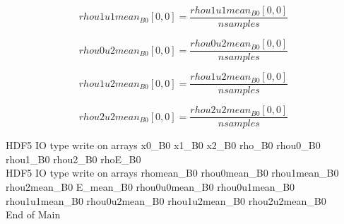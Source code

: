 \documentclass{article}
\begin{document}
\begin{dmath}{rhou1u1mean{_{B0}}}[{0,0}] = \frac{{rhou1u1mean{_{B0}}}[{0,0}]}{nsamples}\end{dmath}

\begin{dmath}{rhou0u2mean{_{B0}}}[{0,0}] = \frac{{rhou0u2mean{_{B0}}}[{0,0}]}{nsamples}\end{dmath}

\begin{dmath}{rhou1u2mean{_{B0}}}[{0,0}] = \frac{{rhou1u2mean{_{B0}}}[{0,0}]}{nsamples}\end{dmath}

\begin{dmath}{rhou2u2mean{_{B0}}}[{0,0}] = \frac{{rhou2u2mean{_{B0}}}[{0,0}]}{nsamples}\end{dmath}

\noindent HDF5 IO type write on arrays x0_B0 x1_B0 x2_B0 rho_B0 rhou0_B0 rhou1_B0 rhou2_B0 rhoE_B0\\\noindent HDF5 IO type write on arrays rhomean_B0 rhou0mean_B0 rhou1mean_B0 rhou2mean_B0 E_mean_B0 rhou0u0mean_B0 rhou0u1mean_B0 rhou1u1mean_B0 rhou0u2mean_B0 rhou1u2mean_B0 rhou2u2mean_B0\\\noindent End of Main\\
\end{document}
